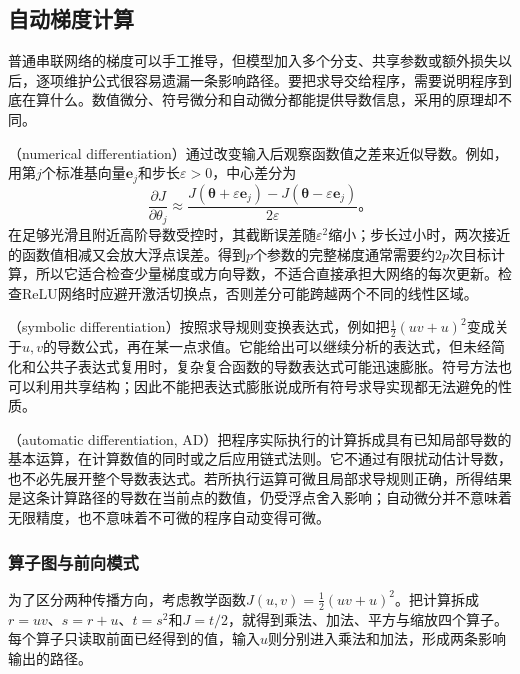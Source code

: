 \subsection{自动梯度计算}
\label{sec:ffn-autodiff}

普通串联网络的梯度可以手工推导，但模型加入多个分支、共享参数或额外损失以后，逐项维护公式很容易遗漏一条影响路径。要把求导交给程序，需要说明程序到底在算什么。数值微分、符号微分和自动微分都能提供导数信息，采用的原理却不同。

（numerical differentiation）通过改变输入后观察函数值之差来近似导数。例如，用第$j$个标准基向量$\bm{e}_j$和步长$\varepsilon>0$，中心差分为
\begin{equation}
  \frac{\partial J}{\partial\theta_j}
  \approx
  \frac{J(\bm{\theta}+\varepsilon\bm{e}_j)
       -J(\bm{\theta}-\varepsilon\bm{e}_j)}{2\varepsilon}\text{。}
  \label{eq:ffn-finite-difference}
\end{equation}
在足够光滑且附近高阶导数受控时，其截断误差随$\varepsilon^2$缩小；步长过小时，两次接近的函数值相减又会放大浮点误差。得到$p$个参数的完整梯度通常需要约$2p$次目标计算，所以它适合检查少量梯度或方向导数，不适合直接承担大网络的每次更新。检查ReLU网络时应避开激活切换点，否则差分可能跨越两个不同的线性区域。

（symbolic differentiation）按照求导规则变换表达式，例如把$\frac12(uv+u)^2$变成关于$u,v$的导数公式，再在某一点求值。它能给出可以继续分析的表达式，但未经简化和公共子表达式复用时，复杂复合函数的导数表达式可能迅速膨胀。符号方法也可以利用共享结构；因此不能把表达式膨胀说成所有符号求导实现都无法避免的性质。

（automatic differentiation, AD）把程序实际执行的计算拆成具有已知局部导数的基本运算，在计算数值的同时或之后应用链式法则。它不通过有限扰动估计导数，也不必先展开整个导数表达式。若所执行运算可微且局部求导规则正确，所得结果是这条计算路径的导数在当前点的数值，仍受浮点舍入影响；自动微分并不意味着无限精度，也不意味着不可微的程序自动变得可微。

\subsubsection{算子图与前向模式}
\label{sec:ffn-autodiff-forward}

为了区分两种传播方向，考虑教学函数$J(u,v)=\frac12(uv+u)^2$。把计算拆成$r=uv$、$s=r+u$、$t=s^2$和$J=t/2$，就得到乘法、加法、平方与缩放四个算子。每个算子只读取前面已经得到的值，输入$u$则分别进入乘法和加法，形成两条影响输出的路径。

